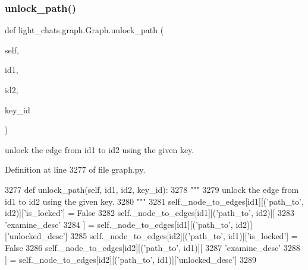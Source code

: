 \subsubsection{\texorpdfstring{unlock\+\_\+path()}{unlock\_path()}}
{\footnotesize\ttfamily def light\+\_\+chats.\+graph.\+Graph.\+unlock\+\_\+path (\begin{DoxyParamCaption}\item[{}]{self,  }\item[{}]{id1,  }\item[{}]{id2,  }\item[{}]{key\+\_\+id }\end{DoxyParamCaption})}

\begin{DoxyVerb}unlock the edge from id1 to id2 using the given key.
\end{DoxyVerb}
 

Definition at line 3277 of file graph.\+py.


\begin{DoxyCode}
3277     \textcolor{keyword}{def }unlock\_path(self, id1, id2, key\_id):
3278         \textcolor{stringliteral}{"""}
3279 \textcolor{stringliteral}{        unlock the edge from id1 to id2 using the given key.}
3280 \textcolor{stringliteral}{        """}
3281         self.\_node\_to\_edges[id1][(\textcolor{stringliteral}{'path\_to'}, id2)][\textcolor{stringliteral}{'is\_locked'}] = \textcolor{keyword}{False}
3282         self.\_node\_to\_edges[id1][(\textcolor{stringliteral}{'path\_to'}, id2)][
3283             \textcolor{stringliteral}{'examine\_desc'}
3284         ] = self.\_node\_to\_edges[id1][(\textcolor{stringliteral}{'path\_to'}, id2)][\textcolor{stringliteral}{'unlocked\_desc'}]
3285         self.\_node\_to\_edges[id2][(\textcolor{stringliteral}{'path\_to'}, id1)][\textcolor{stringliteral}{'is\_locked'}] = \textcolor{keyword}{False}
3286         self.\_node\_to\_edges[id2][(\textcolor{stringliteral}{'path\_to'}, id1)][
3287             \textcolor{stringliteral}{'examine\_desc'}
3288         ] = self.\_node\_to\_edges[id2][(\textcolor{stringliteral}{'path\_to'}, id1)][\textcolor{stringliteral}{'unlocked\_desc'}]
3289 
\end{DoxyCode}
\mbox{\label{classlight__chats_1_1graph_1_1Graph_ab4e757d18538326e65b8ed2dce71d9fa}} 
